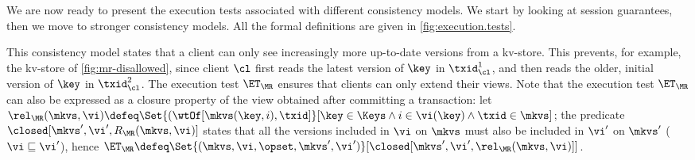 We are now ready to present the execution tests  associated with different consistency models. 
We start by looking at session guarantees, then we move to stronger consistency models. 
All the formal definitions are given in \cref{fig:execution.tests}. 



This consistency model states that a client
can only see increasingly more up-to-date versions from a kv-store. 
This prevents, for example, the kv-store of \cref{fig:mr-disallowed},
since client $\cl$ first reads the latest version of $\key$ in $\txid_{\cl}^{1}$, 
and then reads the older, initial version of $\key$ in $\txid_{\cl}^{2}$.  
The execution test $\ET_{\MR}$ ensures that clients  can only extend their views. 
Note that the execution test $\ET_{\MR}$ can also be expressed as a closure 
property of the view obtained after committing a transaction: 
let $\rel_{\MR}(\mkvs, \vi) \defeq \Set{(\wtOf[\mkvs(\key, i), \txid] }[ \key \in \Keys \wedge i \in \vi(\key) \wedge \txid \in \mkvs]$; 
the predicate $\closed[\mkvs', \vi', R_{\MR}(\mkvs, \vi)]$ states that all the versions included in $\vi$ on $\mkvs$ 
must also be included in $\vi'$ on $\mkvs'$ (\ie $\vi \sqsubseteq \vi'$), hence 
$\ET_{\MR} \defeq \Set{(\mkvs, \vi, \opset, \mkvs', \vi') }[ \closed[\mkvs', \vi', \rel_{\MR}(\mkvs, \vi)]]$.

